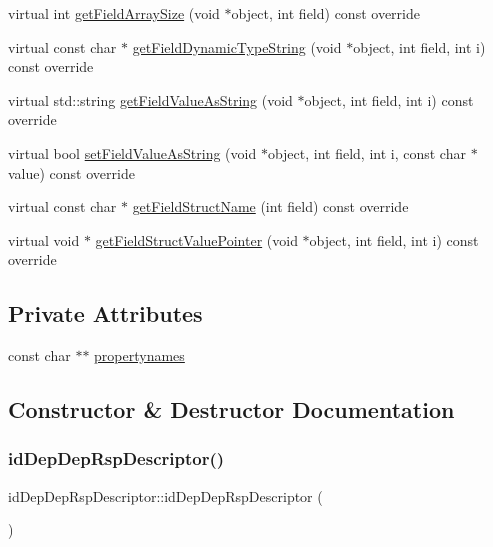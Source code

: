 \begin{DoxyCompactItemize}
\item 
virtual int \hyperlink{classid_dep_dep_rsp_descriptor_ac8e4e19a337c5833273ca1da6488a05d}{get\+Field\+Array\+Size} (void $\ast$object, int field) const override
\item 
virtual const char $\ast$ \hyperlink{classid_dep_dep_rsp_descriptor_a21fe7bc28bb91b7f5d8ce9d84ba1c755}{get\+Field\+Dynamic\+Type\+String} (void $\ast$object, int field, int i) const override
\item 
virtual std\+::string \hyperlink{classid_dep_dep_rsp_descriptor_a3f78b6586d3e0239bf8a530398d6db8c}{get\+Field\+Value\+As\+String} (void $\ast$object, int field, int i) const override
\item 
virtual bool \hyperlink{classid_dep_dep_rsp_descriptor_a03ed926bf151d7c66ac1e6c659013664}{set\+Field\+Value\+As\+String} (void $\ast$object, int field, int i, const char $\ast$value) const override
\item 
virtual const char $\ast$ \hyperlink{classid_dep_dep_rsp_descriptor_ae19bb4da10ef518d7708e9022cc82cca}{get\+Field\+Struct\+Name} (int field) const override
\item 
virtual void $\ast$ \hyperlink{classid_dep_dep_rsp_descriptor_a93338cef2d20630f79cf1f93a081016b}{get\+Field\+Struct\+Value\+Pointer} (void $\ast$object, int field, int i) const override
\end{DoxyCompactItemize}
\subsection*{Private Attributes}
\begin{DoxyCompactItemize}
\item 
const char $\ast$$\ast$ \hyperlink{classid_dep_dep_rsp_descriptor_ab0e20b196152a98a783f887a12b06ff9}{propertynames}
\end{DoxyCompactItemize}


\subsection{Constructor \& Destructor Documentation}
\mbox{\label{classid_dep_dep_rsp_descriptor_a3e2274676a0c9a331848c609c9896ecf}} 
\subsubsection{\texorpdfstring{id\+Dep\+Dep\+Rsp\+Descriptor()}{idDepDepRspDescriptor()}}
{\footnotesize\ttfamily id\+Dep\+Dep\+Rsp\+Descriptor\+::id\+Dep\+Dep\+Rsp\+Descriptor (\begin{DoxyParamCaption}{ }\end{DoxyParamCaption})}

